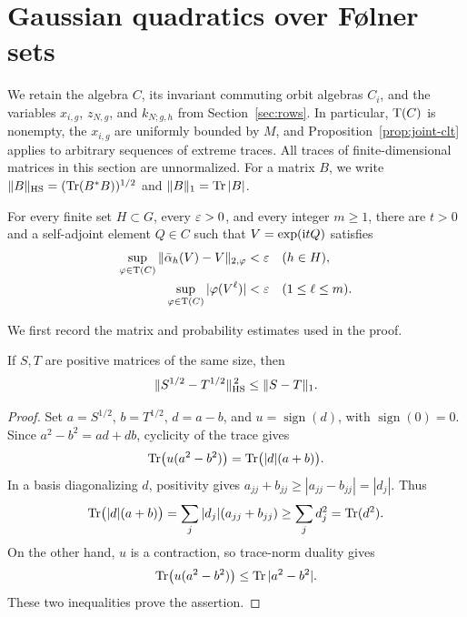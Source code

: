 \section{Gaussian quadratics over F{\o}lner sets}
\label{sec:gaussian}

We retain the algebra \(C\), its invariant commuting orbit algebras
\(C_i\), and the variables \(x_{i,g}\), \(z_{N,g}\), and \(k_{N;g,h}\)
from Section~\ref{sec:rows}. In particular, \(\operatorname{T}(C)\) is nonempty,
the \(x_{i,g}\) are uniformly bounded by \(M\), and
Proposition~\ref{prop:joint-clt} applies to arbitrary sequences of
extreme traces. All traces of finite-dimensional matrices in this
section are unnormalized. For a matrix \(B\), we write
\(\|B\|_{\mathrm{HS}}=(\operatorname{Tr}(B^*B))^{1/2}\) and
\(\|B\|_1=\operatorname{Tr}|B|\).

\begin{proposition}\label{prop:uniform-unitaries}
For every finite set \(H\subset G\), every \(\varepsilon>0\), and every
integer \(m\geq1\), there are \(t>0\) and a self-adjoint element
\(Q\in C\) such that \(V=\exp(\mathrm{i} tQ)\) satisfies
\begin{align}
 \sup_{\varphi\in\operatorname{T}(C)}
 \|\bar\alpha_h(V)-V\|_{2,\varphi}
 &<\varepsilon &&(h\in H), \label{eq:uniform-unitary-invariance}\\
 \sup_{\varphi\in\operatorname{T}(C)}|\varphi(V^\ell)|
 &<\varepsilon &&(1\leq\ell\leq m).
 \label{eq:uniform-unitary-moments}
\end{align}
\end{proposition}

We first record the matrix and probability estimates used in the
proof.

\begin{lemma}\label{lem:square-root-trace}
If \(S,T\) are positive matrices of the same size, then
\[
 \|S^{1/2}-T^{1/2}\|_{\mathrm{HS}}^{\,2}\leq\|S-T\|_1.
\]
\end{lemma}

\begin{proof}
Set \(a=S^{1/2}\), \(b=T^{1/2}\), \(d=a-b\), and
\(u=\operatorname{sign}(d)\), with \(\operatorname{sign}(0)=0\).
Since \(a^2-b^2=ad+db\), cyclicity of the trace gives
\[
 \operatorname{Tr}\bigl(u(a^2-b^2)\bigr)
 =\operatorname{Tr}\bigl(|d|(a+b)\bigr).
\]
In a basis diagonalizing \(d\), positivity gives
\(a_{jj}+b_{jj}\geq|a_{jj}-b_{jj}|=|d_j|\). Thus
\[
 \operatorname{Tr}\bigl(|d|(a+b)\bigr)
 =\sum_j |d_j|(a_{jj}+b_{jj})
 \geq\sum_j d_j^2=\operatorname{Tr}(d^2).
\]
On the other hand, \(u\) is a contraction, so trace-norm duality
gives
\[
 \operatorname{Tr}\bigl(u(a^2-b^2)\bigr)\leq\operatorname{Tr}|a^2-b^2|.
\]
These two inequalities prove the assertion.
\end{proof}

